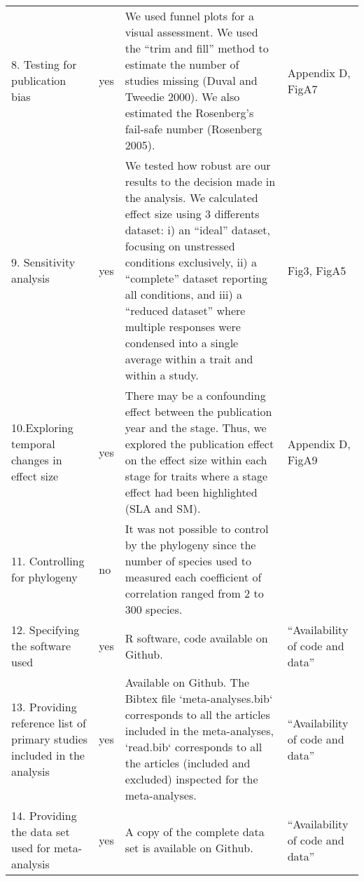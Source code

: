 \documentclass[a4paper]{article}\usepackage[]{graphicx}\usepackage[]{color}
\begin{document}
\begin{table}[h!]
\begin{tabular}{p{3cm} p{1cm} p{10cm} p{3cm}}
  8. Testing for publication bias &	yes	& We used funnel plots for a visual assessment. We used the ``trim and fill'' method to estimate the number of studies missing (Duval and Tweedie 2000). We also estimated the Rosenberg’s fail-safe number (Rosenberg 2005). 	&  Appendix D, FigA7\\
  9. Sensitivity analysis &	yes &	We tested how robust are our results to the decision made in the analysis. We calculated effect size using 3 differents dataset: i) an  ``ideal'' dataset, focusing on unstressed conditions exclusively, ii) a ``complete'' dataset reporting all conditions, and iii) a ``reduced dataset'' where multiple responses were condensed into a single average within a trait and within a study. &	Fig3, FigA5 \\
  10.Exploring temporal changes in effect size &	yes	& There may be a confounding effect between the publication year and the stage. Thus, we explored the publication effect on the effect size within each stage for traits where a stage effect had been highlighted (SLA and SM). & Appendix D, FigA9 \\
  11. Controlling for phylogeny &	no &	It was not possible to control by the phylogeny since the number of species used to measured each coefficient of correlation ranged from 2 to 300 species. &	\\
  12. Specifying the software used &	yes	& R software, code available on Github. & ``Availability of code and data'' \\
 13. Providing reference list of primary studies included in the analysis &	yes &	Available on Github. The Bibtex file `meta-analyses.bib` corresponds to all the articles included in the meta-analyses, `read.bib` corresponds to all the articles (included and excluded) inspected for the meta-analyses.	& ``Availability of code and data'' \\
  14. Providing the data set used for meta-analysis  &	yes &	A copy of the complete data set is available on Github.	& ``Availability of code and data'' \\
   \hline
\end{tabular}
\label{tab:meta}
\end{table}
\end{document}
